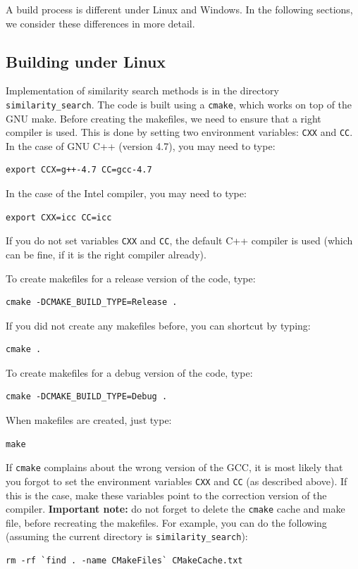 \documentclass[runningheads,a4paper]{llncs}
\newcommand{\ttt}[1]{\texttt{#1}}
\begin{document}
{A build process is different under Linux and Windows. 
In  the following sections, we consider these differences in more detail. 

\subsection{Building under Linux}\label{SectionBuildLinux}
Implementation of similarity search methods is in the directory \ttt{similarity\_search}.
The code is built using a \ttt{cmake}, which works on top of the GNU make.
Before creating the makefiles, we need to ensure that a right compiler is used.
This is done by setting two environment variables: \ttt{CXX} and \ttt{CC}.
In the case of GNU C++ (version 4.7), you may need to type:
\begin{verbatim}
export CCX=g++-4.7 CC=gcc-4.7 
\end{verbatim}
In the case of the Intel compiler, you may need to type:
\begin{verbatim}
export CXX=icc CC=icc 
\end{verbatim}
If you do not set variables \ttt{CXX} and \ttt{CC}, 
the default C++ compiler is used (which can be fine, if it is the right compiler already).


To create makefiles for a release version of the code, type:
\begin{verbatim}
cmake -DCMAKE_BUILD_TYPE=Release .
\end{verbatim}
If you did not create any makefiles before, you can shortcut by typing:
\begin{verbatim}
cmake . 
\end{verbatim}
To create makefiles for a debug version of the code, type:
\begin{verbatim}
cmake -DCMAKE_BUILD_TYPE=Debug .
\end{verbatim}
When makefiles are created, just type:
\begin{verbatim}
make
\end{verbatim}
If \ttt{cmake} complains about the wrong version of the GCC, 
it is most likely that you forgot to set the environment variables \ttt{CXX} and \ttt{CC} (as described above).
If this is the case, make these variables point to the correction version of the compiler.
\textbf{Important note:} 
do not forget to delete the \ttt{cmake} cache and make file, before recreating the makefiles.
For example, you can do the following (assuming the current directory is \ttt{similarity\_search}):
\begin{verbatim}
rm -rf `find . -name CMakeFiles` CMakeCache.txt
\end{verbatim}

}
\end{document}
